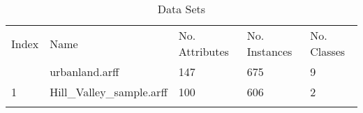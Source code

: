 \begin{table*}[h]
\caption{Data Sets}
\label{tbl:datasets}\begin{tabular}{lllll}
\noalign{\smallskip}\hline\noalign{\smallskip}
Index&Name&No. Attributes&No. Instances&No. Classes\\\noalign{\smallskip}\hline
0&urbanland.arff&147&675&9\\
1&Hill_Valley_sample.arff&100&606&2\\
\noalign{\smallskip}\hline
\end{tabular}
\end{table*}